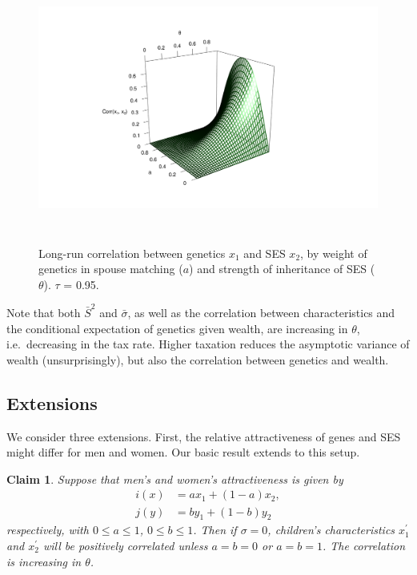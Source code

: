 \documentclass[
  12pt,
]{article}
\newtheorem{claim}{Claim}
\theoremstyle{definition}
\theoremstyle{definition}
\theoremstyle{definition}
\theoremstyle{definition}
\theoremstyle{remark}
\begin{document}
\begin{figure}

{\centering \includegraphics[height=3.5in]{trading-genetics_files/figure-latex/pic-asymptotic-corr-1-rgl} 

}

\caption{Long-run correlation between genetics $x_1$ and SES $x_2$, by weight of genetics in spouse matching ($a$) and strength of inheritance of SES ($\theta$). $\tau$ = 0.95.}\label{fig:pic-asymptotic-corr}
\end{figure}

Note that both \(\bar{S}^{2}\) and \(\bar{\sigma}\), as well as the correlation
between characteristics and the conditional expectation of genetics given
wealth, are increasing in \(\theta\), i.e.~decreasing in the tax rate. Higher
taxation reduces the asymptotic variance of wealth (unsurprisingly), but
also the correlation between genetics and wealth.

\hypertarget{extensions}{%
\subsection{Extensions}\label{extensions}}

We consider three extensions. First, the relative attractiveness of genes and
SES might differ for men and women. Our basic result extends to this setup.

\begin{claim}\label{claim-men-women-different}
Suppose that men's and women's attractiveness is given by
\begin{align*}
i(x) &= ax_1 + (1-a)x_2, \\
j(y) &= by_1 + (1-b)y_2
\end{align*}
respectively, with $0\le a \le 1$, $0 \le b \le 1$. Then if $\sigma = 0$, children's 
characteristics $x^\prime_1$ and $x^\prime_2$ will be positively correlated 
unless $a = b = 0$ or $a = b = 1$. The correlation is increasing in $\theta$.

\end{claim}
\end{document}
